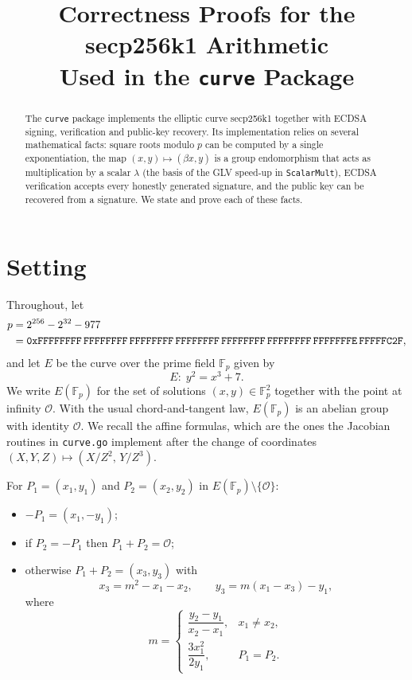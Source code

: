 \documentclass[11pt]{article}
\title{Correctness Proofs for the secp256k1 Arithmetic\\ Used in the \texttt{curve} Package}
\author{}
\date{}
\theoremstyle{definition}
\theoremstyle{remark}
\newcommand{\F}{\mathbb{F}}
\newcommand{\Oinf}{\mathcal{O}}
\begin{document}
\maketitle

\begin{abstract}
The \texttt{curve} package implements the elliptic curve secp256k1 together
with ECDSA signing, verification and public-key recovery. Its implementation
relies on several mathematical facts: square roots modulo $p$ can be computed by
a single exponentiation, the map $(x,y)\mapsto(\beta x,y)$ is a group
endomorphism that acts as multiplication by a scalar $\lambda$ (the basis of
the GLV speed-up in \texttt{ScalarMult}), ECDSA verification accepts every
honestly generated signature, and the public key can be recovered from a
signature. We state and prove each of these facts.
\end{abstract}

\section{Setting}

Throughout, let
\begin{align*}
p &= 2^{256} - 2^{32} - 977 \\
  &= \texttt{0xFFFFFFFF\,FFFFFFFF\,FFFFFFFF\,FFFFFFFF\,FFFFFFFF\,FFFFFFFF\,FFFFFFFE\,FFFFFC2F},
\end{align*}
and let $E$ be the curve over the prime field $\F_p$ given by
\[
  E:\; y^2 = x^3 + 7 .
\]
We write $E(\F_p)$ for the set of solutions $(x,y)\in\F_p^2$ together with the
point at infinity $\Oinf$. With the usual chord-and-tangent law, $E(\F_p)$ is an
abelian group with identity $\Oinf$. We recall the affine formulas, which are
the ones the Jacobian routines in \texttt{curve.go} implement after the change
of coordinates $(X,Y,Z)\mapsto(X/Z^2,\,Y/Z^3)$.

For $P_1=(x_1,y_1)$ and $P_2=(x_2,y_2)$ in $E(\F_p)\setminus\{\Oinf\}$:
\begin{itemize}
  \item $-P_1 = (x_1,-y_1)$;
  \item if $P_2 = -P_1$ then $P_1+P_2=\Oinf$;
  \item otherwise $P_1+P_2 = (x_3,y_3)$ with
  \begin{equation}\label{eq:add}
    x_3 = m^2 - x_1 - x_2,\qquad y_3 = m(x_1-x_3) - y_1,
  \end{equation}
  where
  \begin{equation}\label{eq:slope}
    m = \begin{cases}
      \dfrac{y_2-y_1}{x_2-x_1}, & x_1\neq x_2,\\[2ex]
      \dfrac{3x_1^2}{2y_1}, & P_1=P_2 .
    \end{cases}
  \end{equation}
\end{itemize}
\end{document}
